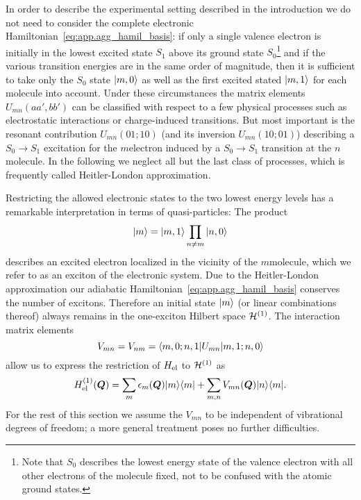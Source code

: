In order to describe the experimental setting described in the introduction we do not need to consider the complete electronic Hamiltonian~\ref{eq:app.agg_hamil_basis}:
if only a single valence electron is initially in the lowest excited state $S_1$ above its ground state $S_0$\footnote{%
  Note that $S_0$ describes the lowest energy state of the valence electron with all other electrons of the molecule fixed, not to be confused with the atomic ground states.
}
and if the various transition energies are in the same order of magnitude, then it is sufficient to take only the $S_0$ state $| m, 0 \rangle$ as well as the first excited stated $| m, 1 \rangle$ for each molecule into account.
Under these circumstances the matrix elements $U_{mn}(aa', bb')$ can be classified with respect to a few physical processes such as electrostatic interactions or charge-induced transitions.
But most important is the resonant contribution $U_{mn}(01; 10)$ (and its inversion $U_{mn}(10; 01)$) describing a $S_0 \to S_1$ excitation for the $m$\th electron induced by a  $S_0 \to S_1$ transition at the $n$\th molecule.
In the following we neglect all but the last class of processes, which is frequently called Heitler-London approximation.

Restricting the allowed electronic states to the two lowest energy levels has a remarkable interpretation in terms of quasi-particles:
The product
\begin{equation}
  | m \rangle = | m, 1 \rangle \prod_{n \neq m} | n, 0 \rangle
  \label{eq:app.exciton_state}
\end{equation}
describes an excited electron localized in the vicinity of the $m$\th molecule, which we refer to as an exciton of the electronic system.
Due to the Heitler-London approximation our adiabatic Hamiltonian~\ref{eq:app.agg_hamil_basis} conserves the number of excitons.
Therefore an initial state $| m \rangle$ (or linear combinations thereof) always remains in the one-exciton Hilbert space $\mathcal{H}^{(1)}$.
The interaction matrix elements
\begin{equation*}
  V_{mn} = V_{nm} = \langle m, 0; n, 1 | U_{mn} | m, 1; n, 0 \rangle
\end{equation*}
allow us to express the restriction of $H_\mathrm{el}$ to $\mathcal{H}^{(1)}$ as
\begin{equation*}
  H_\mathrm{el}^{(1)}(\boldsymbol{Q}) = \sum_m \epsilon_m(\boldsymbol{Q}) | m \rangle\langle m | + \sum_{m,n} V_{mn}(\boldsymbol{Q}) | n \rangle\langle m |.
\end{equation*}
For the rest of this section we assume the $V_{mn}$ to be independent of vibrational degrees of freedom; a more general treatment poses no further difficulties.\\

